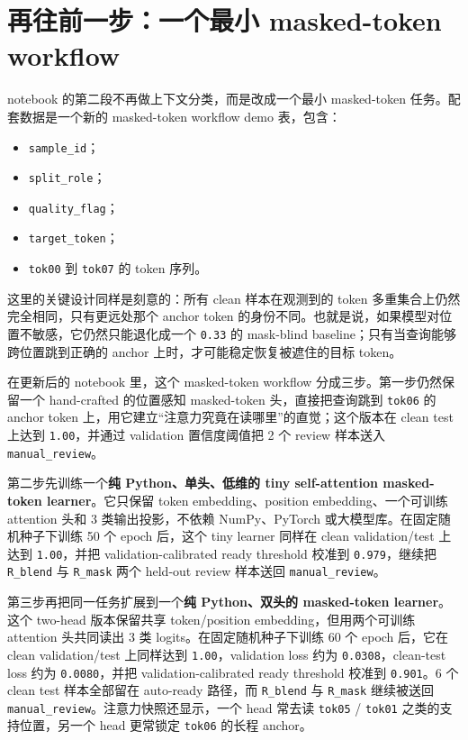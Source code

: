 \section{再往前一步：一个最小 masked-token workflow}

notebook 的第二段不再做上下文分类，而是改成一个最小 masked-token 任务。配套数据是一个新的 masked-token workflow demo 表，包含：

\begin{itemize}
    \item \texttt{sample\_id}；
    \item \texttt{split\_role}；
    \item \texttt{quality\_flag}；
    \item \texttt{target\_token}；
    \item \texttt{tok00} 到 \texttt{tok07} 的 token 序列。
\end{itemize}

这里的关键设计同样是刻意的：所有 clean 样本在观测到的 token 多重集合上仍然完全相同，只有更远处那个 anchor token 的身份不同。也就是说，如果模型对位置不敏感，它仍然只能退化成一个 \texttt{0.33} 的 mask-blind baseline；只有当查询能够跨位置跳到正确的 anchor 上时，才可能稳定恢复被遮住的目标 token。

在更新后的 notebook 里，这个 masked-token workflow 分成三步。第一步仍然保留一个 hand-crafted 的位置感知 masked-token 头，直接把查询跳到 \texttt{tok06} 的 anchor token 上，用它建立“注意力究竟在读哪里”的直觉；这个版本在 clean test 上达到 \texttt{1.00}，并通过 validation 置信度阈值把 2 个 review 样本送入 \texttt{manual\_review}。

第二步先训练一个\textbf{纯 Python、单头、低维的 tiny self-attention masked-token learner}。它只保留 token embedding、position embedding、一个可训练 attention 头和 3 类输出投影，不依赖 NumPy、PyTorch 或大模型库。在固定随机种子下训练 50 个 epoch 后，这个 tiny learner 同样在 clean validation/test 上达到 \texttt{1.00}，并把 validation-calibrated ready threshold 校准到 \texttt{0.979}，继续把 \texttt{R\_blend} 与 \texttt{R\_mask} 两个 held-out review 样本送回 \texttt{manual\_review}。

第三步再把同一任务扩展到一个\textbf{纯 Python、双头的 masked-token learner}。这个 two-head 版本保留共享 token/position embedding，但用两个可训练 attention 头共同读出 3 类 logits。在固定随机种子下训练 60 个 epoch 后，它在 clean validation/test 上同样达到 \texttt{1.00}，validation loss 约为 \texttt{0.0308}，clean-test loss 约为 \texttt{0.0080}，并把 validation-calibrated ready threshold 校准到 \texttt{0.901}。6 个 clean test 样本全部留在 auto-ready 路径，而 \texttt{R\_blend} 与 \texttt{R\_mask} 继续被送回 \texttt{manual\_review}。注意力快照还显示，一个 head 常去读 \texttt{tok05} / \texttt{tok01} 之类的支持位置，另一个 head 更常锁定 \texttt{tok06} 的长程 anchor。


